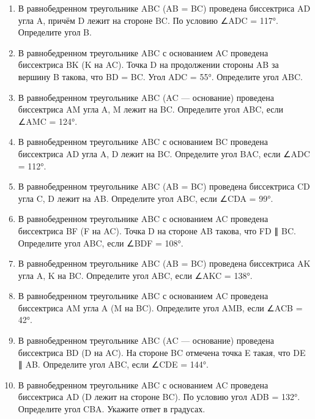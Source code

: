 \documentclass[a4paper,12pt]{article}
\newcommand{\taskspace}{\par\vspace{0.42cm}}
\begin{document}
\begin{enumerate}
\taskspace

\item В равнобедренном треугольнике ABC (AB = BC) проведена биссектриса AD угла A, причём D лежит на стороне BC. По условию ∠ADC = 117°. Определите угол B.

\taskspace

\item В равнобедренном треугольнике ABC с основанием AC проведена биссектриса BK (K на AC). Точка D на продолжении стороны AB за вершину B такова, что BD = BC. Угол ADC = 55°. Определите угол ABC.

\taskspace

\item В равнобедренном треугольнике ABC (AC --- основание) проведена биссектриса AM угла A, M лежит на BC. Определите угол ABC, если ∠AMC = 124°.

\taskspace

\item В равнобедренном треугольнике ABC с основанием BC проведена биссектриса AD угла A, D лежит на BC. Определите угол BAC, если ∠ADC = 112°.

\taskspace

\item В равнобедренном треугольнике ABC (AB = BC) проведена биссектриса CD угла C, D лежит на AB. Определите угол ABC, если ∠CDA = 99°.

\taskspace

\item В равнобедренном треугольнике ABC с основанием AC проведена биссектриса BF (F на AC). Точка D на стороне AB такова, что FD ∥ BC. Определите угол ABC, если ∠BDF = 108°.

\taskspace

\item В равнобедренном треугольнике ABC (AB = BC) проведена биссектриса AK угла A, K на BC. Определите угол ABC, если ∠AKC = 138°.

\taskspace

\item В равнобедренном треугольнике ABC с основанием AC проведена биссектриса AM угла A (M на BC). Определите угол AMB, если ∠ACB = 42°.

\taskspace

\item В равнобедренном треугольнике ABC (AC --- основание) проведена биссектриса BD (D на AC). На стороне BC отмечена точка E такая, что DE ∥ AB. Определите угол ABC, если ∠CDE = 144°.

\taskspace

\item В равнобедренном треугольнике ABC с основанием AC проведена биссектриса AD (D лежит на стороне BC). По условию угол ADB = 132°. Определите угол CBA. Укажите ответ в градусах.

\taskspace

\end{enumerate}
\end{document}
